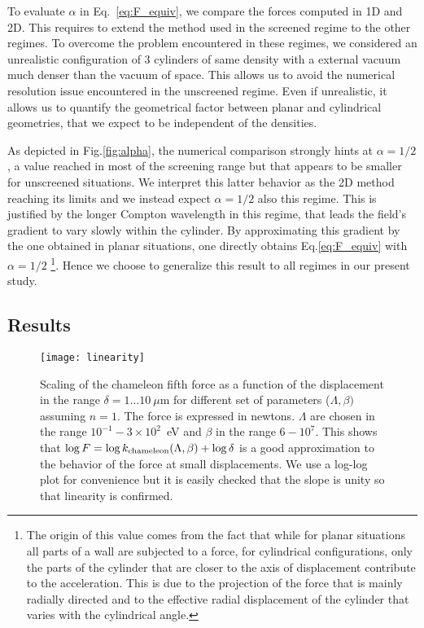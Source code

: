 \documentclass[aps,prd,twocolumn,superscriptaddress,nofootinbib,eqsecnumm,showpacs]{revtex4-1}
\renewcommand\({\left(}
\renewcommand\){\right)}
\renewcommand\[{\left[}
\renewcommand\]{\right]}
\begin{document}
To evaluate $\alpha$ in Eq.~\eqref{eq:F_equiv}, we compare the forces computed in 1D and 2D. This requires to extend the method used in the screened regime to the other regimes. To overcome the problem encountered in these regimes, we considered an unrealistic configuration of 3 cylinders of same density with a external vacuum much denser than the vacuum of space. This allows us to avoid the numerical resolution issue encountered in the unscreened regime. Even if unrealistic, it allows us to quantify the geometrical factor between planar and cylindrical geometries, that we expect to be independent of the densities.

As depicted in Fig.\ref{fig:alpha}, the numerical comparison strongly hints at $\alpha
= 1/2$, a value reached in most of the screening range but that appears to be smaller for unscreened situations. We interpret this latter behavior as the 2D method reaching its limits and we instead expect $\alpha = 1/2$ also this regime. This is justified by the longer Compton wavelength in this regime, that leads the field's
gradient to vary slowly within the cylinder. By approximating this gradient by the one obtained in planar situations, one directly obtains Eq.\eqref{eq:F_equiv} with $\alpha= 1/2$ \footnote{The origin of this value comes from the fact that while for planar situations all parts of a wall are subjected to a force, for cylindrical configurations, only the parts of the cylinder that are closer to the axis of displacement contribute to the acceleration. This is due to the projection of the force that is mainly radially directed and to the effective radial displacement of the cylinder that varies with the cylindrical angle.}. Hence we choose to generalize this result to all regimes in our present study.



\subsection{Results}
\begin{figure}
\texttt{[image: linearity]}
\caption{Scaling of the chameleon fifth force as a function of the displacement in the range $\delta=1\ldots 10~\mu$m for different set of parameters ($\Lambda,\beta)$ assuming $n=1$. The force is expressed in newtons. $\Lambda$ are chosen in the range $10^{-1}-3\times10^2$~eV and $\beta$ in the range $6-10^7$. This shows that $\log F=\log k_{\rm chameleon}(\Lambda,\beta) + \log \delta$ is a good approximation to the behavior of the force at small displacements. We use a log-log plot for convenience but it is easily checked that the slope is unity so that linearity is confirmed.}
\label{fig:linear}
\end{figure}	
\end{document}
